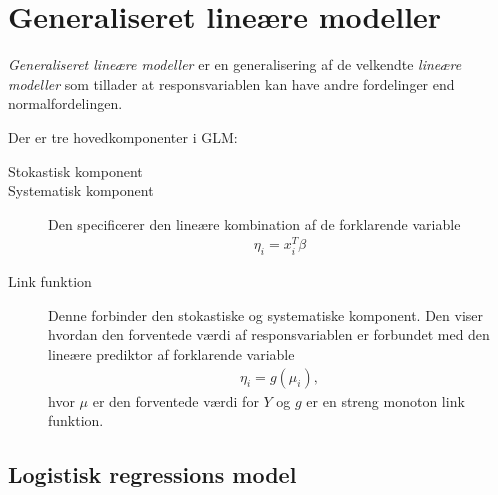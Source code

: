 \section{Generaliseret lineære modeller}
\textit{Generaliseret lineære modeller} er en generalisering af de velkendte \textit{lineære modeller} som tillader at responsvariablen kan have andre fordelinger end normalfordelingen.

Der er tre hovedkomponenter i GLM:
\begin{description}
\item[Stokastisk komponent] 

\item[Systematisk komponent] 
Den specificerer den lineære kombination af de forklarende variable
\begin{align*}
\eta_i = x_i^T \beta
\end{align*}
\item[Link funktion]
Denne forbinder den stokastiske og systematiske komponent. Den viser hvordan den forventede værdi af responsvariablen er forbundet med den lineære prediktor af forklarende variable
\begin{align*}
\eta_i=g(\mu_i),
\end{align*} 
hvor $\mu$ er den forventede værdi for $Y$ og $g$ er en streng monoton link funktion.
\end{description}

\subsection{Logistisk regressions model}

